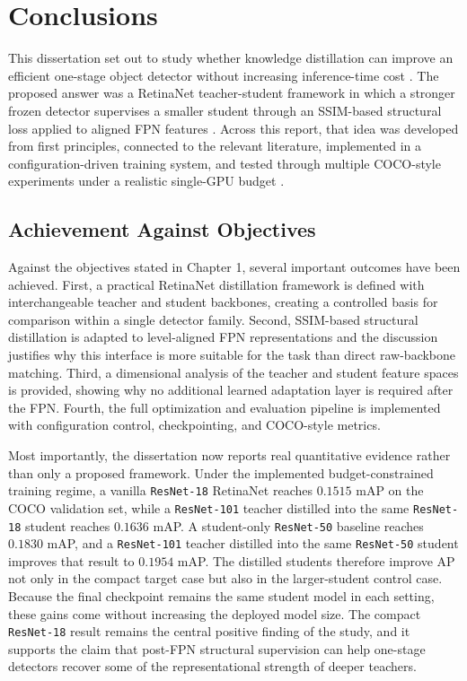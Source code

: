 \chapter{Conclusions}

This dissertation set out to study whether knowledge distillation can improve an efficient one-stage object detector without increasing inference-time cost \cite{hinton2015distilling}. The proposed answer was a RetinaNet teacher-student framework in which a stronger frozen detector supervises a smaller student through an SSIM-based structural loss applied to aligned FPN features \cite{lin2017fpn,lin2017focal,wang2004ssim,derijk2022structural}. Across this report, that idea was developed from first principles, connected to the relevant literature, implemented in a configuration-driven training system, and tested through multiple COCO-style experiments under a realistic single-GPU budget \cite{lin2014coco}.

\section{Achievement Against Objectives}

Against the objectives stated in Chapter 1, several important outcomes have been achieved. First, a practical RetinaNet distillation framework is defined with interchangeable teacher and student backbones, creating a controlled basis for comparison within a single detector family. Second, SSIM-based structural distillation is adapted to level-aligned FPN representations and the discussion justifies why this interface is more suitable for the task than direct raw-backbone matching. Third, a dimensional analysis of the teacher and student feature spaces is provided, showing why no additional learned adaptation layer is required after the FPN. Fourth, the full optimization and evaluation pipeline is implemented with configuration control, checkpointing, and COCO-style metrics.

Most importantly, the dissertation now reports real quantitative evidence rather than only a proposed framework. Under the implemented budget-constrained training regime, a vanilla \texttt{ResNet-18} RetinaNet reaches $0.1515$ mAP on the COCO validation set, while a \texttt{ResNet-101} teacher distilled into the same \texttt{ResNet-18} student reaches $0.1636$ mAP. A student-only \texttt{ResNet-50} baseline reaches $0.1830$ mAP, and a \texttt{ResNet-101} teacher distilled into the same \texttt{ResNet-50} student improves that result to $0.1954$ mAP. The distilled students therefore improve AP not only in the compact target case but also in the larger-student control case. Because the final checkpoint remains the same student model in each setting, these gains come without increasing the deployed model size. The compact \texttt{ResNet-18} result remains the central positive finding of the study, and it supports the claim that post-FPN structural supervision can help one-stage detectors recover some of the representational strength of deeper teachers.

